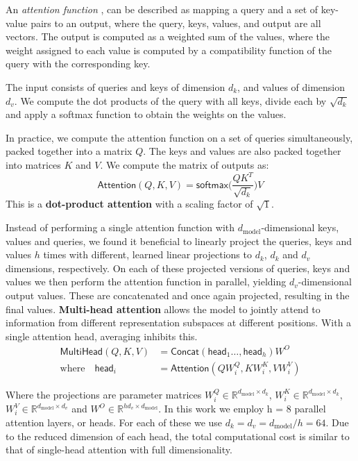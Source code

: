 \documentclass{article}
\begin{document}
	An \textit{attention function} \cite{vaswani2017attention}, can be described as mapping a query and 
	a set of key-value pairs to an output, where the query, keys, values, and output are all vectors. The 
	output is computed as a weighted sum of the values, where the weight assigned to each value is 
	computed by a compatibility function of the query with the corresponding key.

	The input consists of queries and keys of dimension $d_k$, and values of dimension $d_v$. We 
	compute the dot products of the query with all keys, divide each by $\sqrt{d_k}$ and apply a 
	softmax function to obtain the weights on the values.
	
	In practice, we compute the attention function on a set of queries simultaneously, packed together 
	into a matrix $Q$. The keys and values are also packed together into matrices $K$ and $V$. We 
	compute the matrix of outputs as:
	\begin{equation}
		\label{eqn:attention}
		\mathsf{Attention}(Q, K, V) = \mathsf{softmax} \big( \frac{QK^T}{\sqrt{d_k}}\big)V
	\end{equation}
	This is a \textbf{dot-product attention} with a scaling factor of $\sqrt{1}$. 
	
	Instead of performing a single attention function with $d_\text{model}$-dimensional keys, values 
	and queries, we found it beneficial to linearly project the queries, keys and values $h$ times with 
	different, learned linear projections to $d_k$, $d_k$ and $d_v$ dimensions, respectively. On each of 
	these projected versions of queries, keys and values we then perform the attention function in 
	parallel, yielding $d_v$-dimensional output values. 
	These are concatenated and once again projected, resulting in the final values.
	\textbf{Multi-head attention} allows the model to jointly attend to information from different 
	representation subspaces at different positions. With a single attention head, averaging inhibits this.
		\begin{equation}
		\label{eqn:multihead}
		\begin{split}
		\mathsf{MultiHead}(Q, K, V) & = \mathsf{Concat}(\mathsf{head}_1 \dots, \mathsf{head}_h) W^O 
		\\
		\text{where} \quad \mathsf{head}_i & = \mathsf{Attention}(QW_i^Q, KW_i^K , VW_i^V)
		\end{split}
	\end{equation}
	
	Where the projections are parameter matrices $W_i^Q \in \mathbb{R}^{d_{\text{model}}\times 
	d_k}$, %
	$W_i^K \in \mathbb{R}^{d_{\text{model}}\times d_k}$, $W_i^V \in 
	\mathbb{R}^{d_{\text{model}}\times d_v}$ and $W^O \in \mathbb{R}^{hd_v \times 
	d_{\text{model}}}$.
	In this work we employ h = 8 parallel attention layers, or heads. For each of these we use $d_k = d_v 
	= d_\text{model}/h = 64$. Due to the reduced dimension of each head, the total 
	computational cost is similar to that of single-head attention with full dimensionality.
	
\end{document}
